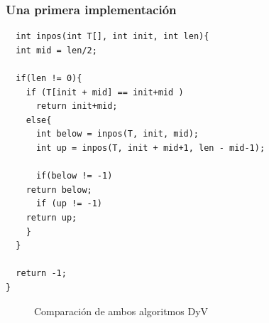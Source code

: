 \documentclass[spanish]{beamer}
\begin{document}
\begin{frame}[fragile]\frametitle{Una primera implementación}
  \begin{lstlisting}
  int inpos(int T[], int init, int len){
  int mid = len/2;
  
  if(len != 0){
    if (T[init + mid] == init+mid )
      return init+mid;
    else{
      int below = inpos(T, init, mid);
      int up = inpos(T, init + mid+1, len - mid-1);

      if(below != -1)
	return below;
      if (up != -1)
	return up;	  
    }
  }

  return -1;
}
\end{lstlisting}
\end{frame}

\begin{frame}[fragile]

  \begin{figure}[H]
  \centering   

\caption{Comparación de ambos algoritmos DyV}
\end{figure}
  
\end{frame}
\end{document}
